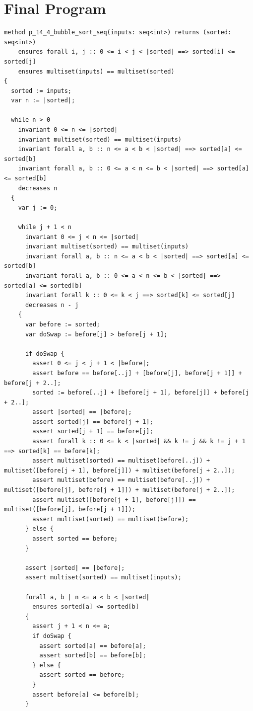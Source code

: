 \documentclass{article}
\begin{document}
\section*{Final Program}
\begin{lstlisting}
method p_14_4_bubble_sort_seq(inputs: seq<int>) returns (sorted: seq<int>)
	ensures forall i, j :: 0 <= i < j < |sorted| ==> sorted[i] <= sorted[j]
	ensures multiset(inputs) == multiset(sorted)
{
  sorted := inputs;
  var n := |sorted|;

  while n > 0
    invariant 0 <= n <= |sorted|
    invariant multiset(sorted) == multiset(inputs)
    invariant forall a, b :: n <= a < b < |sorted| ==> sorted[a] <= sorted[b]
    invariant forall a, b :: 0 <= a < n <= b < |sorted| ==> sorted[a] <= sorted[b]
    decreases n
  {
    var j := 0;

    while j + 1 < n
      invariant 0 <= j < n <= |sorted|
      invariant multiset(sorted) == multiset(inputs)
      invariant forall a, b :: n <= a < b < |sorted| ==> sorted[a] <= sorted[b]
      invariant forall a, b :: 0 <= a < n <= b < |sorted| ==> sorted[a] <= sorted[b]
      invariant forall k :: 0 <= k < j ==> sorted[k] <= sorted[j]
      decreases n - j
    {
      var before := sorted;
      var doSwap := before[j] > before[j + 1];

      if doSwap {
        assert 0 <= j < j + 1 < |before|;
        assert before == before[..j] + [before[j], before[j + 1]] + before[j + 2..];
        sorted := before[..j] + [before[j + 1], before[j]] + before[j + 2..];
        assert |sorted| == |before|;
        assert sorted[j] == before[j + 1];
        assert sorted[j + 1] == before[j];
        assert forall k :: 0 <= k < |sorted| && k != j && k != j + 1 ==> sorted[k] == before[k];
        assert multiset(sorted) == multiset(before[..j]) + multiset([before[j + 1], before[j]]) + multiset(before[j + 2..]);
        assert multiset(before) == multiset(before[..j]) + multiset([before[j], before[j + 1]]) + multiset(before[j + 2..]);
        assert multiset([before[j + 1], before[j]]) == multiset([before[j], before[j + 1]]);
        assert multiset(sorted) == multiset(before);
      } else {
        assert sorted == before;
      }

      assert |sorted| == |before|;
      assert multiset(sorted) == multiset(inputs);

      forall a, b | n <= a < b < |sorted|
        ensures sorted[a] <= sorted[b]
      {
        assert j + 1 < n <= a;
        if doSwap {
          assert sorted[a] == before[a];
          assert sorted[b] == before[b];
        } else {
          assert sorted == before;
        }
        assert before[a] <= before[b];
      }


\end{lstlisting}
\end{document}
